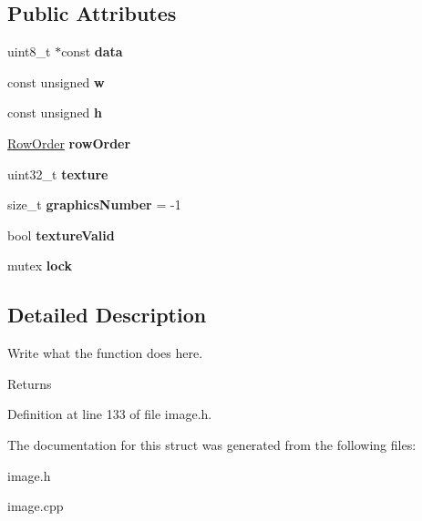 \subsection*{Public Attributes}
\begin{DoxyCompactItemize}
\item 
\hypertarget{structImage_1_1data__t_ac67fc276ee2d36b128b55765d3c17e34}{uint8\+\_\+t $\ast$const {\bfseries data}}\label{structImage_1_1data__t_ac67fc276ee2d36b128b55765d3c17e34}

\item 
\hypertarget{structImage_1_1data__t_a96f2d68563d824c50271ec4bd9678a90}{const unsigned {\bfseries w}}\label{structImage_1_1data__t_a96f2d68563d824c50271ec4bd9678a90}

\item 
\hypertarget{structImage_1_1data__t_af65617c507d10138bd17ab0f2b168c18}{const unsigned {\bfseries h}}\label{structImage_1_1data__t_af65617c507d10138bd17ab0f2b168c18}

\item 
\hypertarget{structImage_1_1data__t_a421352aef192cbfbe3573553602b308d}{\hyperlink{classImage_a856d0983e089ff127d0bcad3828c1aab}{Row\+Order} {\bfseries row\+Order}}\label{structImage_1_1data__t_a421352aef192cbfbe3573553602b308d}

\item 
\hypertarget{structImage_1_1data__t_a18bba5bf2463c72c13fd56ec736259e9}{uint32\+\_\+t {\bfseries texture}}\label{structImage_1_1data__t_a18bba5bf2463c72c13fd56ec736259e9}

\item 
\hypertarget{structImage_1_1data__t_ae36abf1f11268ef7fe59687c73aca3cf}{size\+\_\+t {\bfseries graphics\+Number} = -\/1}\label{structImage_1_1data__t_ae36abf1f11268ef7fe59687c73aca3cf}

\item 
\hypertarget{structImage_1_1data__t_a149c957f170d9885b4b7245d10f93f3b}{bool {\bfseries texture\+Valid}}\label{structImage_1_1data__t_a149c957f170d9885b4b7245d10f93f3b}

\item 
\hypertarget{structImage_1_1data__t_af8a117a1f656faa849809e187720e969}{mutex {\bfseries lock}}\label{structImage_1_1data__t_af8a117a1f656faa849809e187720e969}

\end{DoxyCompactItemize}


\subsection{Detailed Description}
Write what the function does here. 

\begin{DoxyReturn}{Returns}

\end{DoxyReturn}


Definition at line 133 of file image.\+h.



The documentation for this struct was generated from the following files\+:\begin{DoxyCompactItemize}
\item 
image.\+h\item 
image.\+cpp\end{DoxyCompactItemize}
